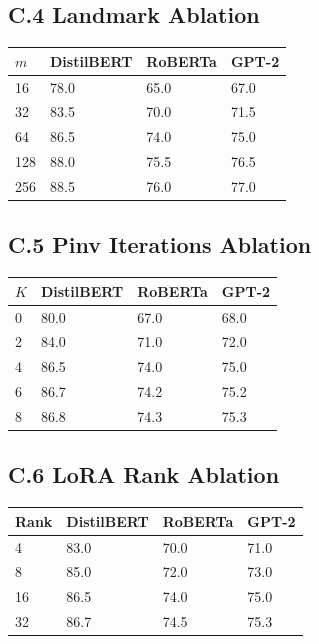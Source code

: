 \subsection{C.4 Landmark Ablation}

\begin{table}[H]
\centering
\small
\begin{tabular}{llll}
\toprule
\textbf{$m$} & \textbf{DistilBERT} & \textbf{RoBERTa} & \textbf{GPT-2} \\
\midrule
16 & 78.0 & 65.0 & 67.0 \\
32 & 83.5 & 70.0 & 71.5 \\
64 & 86.5 & 74.0 & 75.0 \\
128 & 88.0 & 75.5 & 76.5 \\
256 & 88.5 & 76.0 & 77.0 \\
\bottomrule
\end{tabular}
\end{table}

\subsection{C.5 Pinv Iterations Ablation}

\begin{table}[H]
\centering
\small
\begin{tabular}{llll}
\toprule
\textbf{$K$} & \textbf{DistilBERT} & \textbf{RoBERTa} & \textbf{GPT-2} \\
\midrule
0 & 80.0 & 67.0 & 68.0 \\
2 & 84.0 & 71.0 & 72.0 \\
4 & 86.5 & 74.0 & 75.0 \\
6 & 86.7 & 74.2 & 75.2 \\
8 & 86.8 & 74.3 & 75.3 \\
\bottomrule
\end{tabular}
\end{table}

\subsection{C.6 LoRA Rank Ablation}

\begin{table}[H]
\centering
\small
\begin{tabular}{llll}
\toprule
\textbf{Rank} & \textbf{DistilBERT} & \textbf{RoBERTa} & \textbf{GPT-2} \\
\midrule
4 & 83.0 & 70.0 & 71.0 \\
8 & 85.0 & 72.0 & 73.0 \\
16 & 86.5 & 74.0 & 75.0 \\
32 & 86.7 & 74.5 & 75.3 \\
\bottomrule
\end{tabular}
\end{table}

